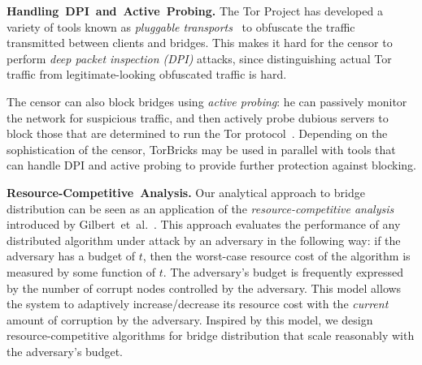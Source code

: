 \documentclass[letterpaper,twocolumn,10pt]{article}
\newcommand{\etal}{et~al.}
\newcommand{\bricks}{}
\def\bricks/{\mbox{TorBricks}}
\newcommand{\sfsize}{\fontsize{0.68\baselineskip}{0.68\baselineskip}\selectfont}
\newcommand{\sans}[1]{\textbf{\textsf{\sfsize \mbox{#1}}}}
\newcommand{\para}[1]{\vspace{0.55em} \noindent \sans{{\mbox{#1}}}}
\begin{document}
\para{Handling DPI and Active Probing.} The Tor Project has developed a variety of tools known as \emph{pluggable transports}~\cite{Tor:PluggableTransport} to obfuscate the traffic transmitted between clients and bridges. This makes it hard for the censor to perform \emph{deep packet inspection (DPI)} attacks, since distinguishing actual Tor traffic from legitimate-looking obfuscated traffic is hard.

The censor can also block bridges using \emph{active probing}: he can passively monitor the network for suspicious traffic, and then actively probe dubious servers to block those that are determined to run the Tor protocol~\cite{Ensafi2015b}.
Depending on the sophistication of the censor, \bricks/ may be used in parallel with tools that can handle DPI and active probing to provide further protection against blocking.



\para{Resource-Competitive Analysis.} Our analytical approach to bridge distribution can be seen as an application of the \emph{resource-competitive analysis} introduced by Gilbert~\etal~\cite{Gilbert:2012:RAN:2335470.2335471,Bender:2015:SIGACT}. This approach evaluates the performance of any distributed algorithm under attack by an adversary in the following way: if the adversary has a budget of $t$, then the worst-case resource cost of the algorithm is measured by some function of $t$. The adversary's budget is frequently expressed by the number of corrupt nodes controlled by the adversary. This model allows the system to adaptively increase/decrease its resource cost with the \emph{current} amount of corruption by the adversary. Inspired by this model, we design resource-competitive algorithms for bridge distribution that scale reasonably with the adversary's budget.
\end{document}

